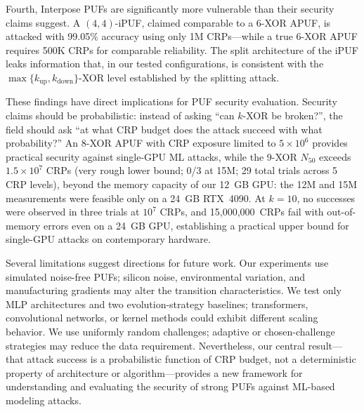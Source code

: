 Fourth, Interpose PUFs are significantly more vulnerable than their security
claims suggest.  A $(4,4)$-iPUF, claimed comparable to a 6-XOR APUF, is
attacked with 99.05\% accuracy using only 1M CRPs---while a true 6-XOR APUF
requires 500K CRPs for comparable reliability.  The split architecture of the
iPUF leaks information that, in our tested configurations, is consistent
with the $\max\{k_{\text{up}}, k_{\text{down}}\}$-XOR level established by
the splitting attack.

These findings have direct implications for PUF security evaluation.  Security
claims should be probabilistic: instead of asking ``can $k$-XOR be broken?'',
the field should ask ``at what CRP budget does the attack succeed with what
probability?''  An 8-XOR APUF with CRP exposure limited to $5\times10^6$
provides practical security against single-GPU ML attacks, while the 9-XOR
$N_{50}$ exceeds $1.5\times10^7$ CRPs (very rough lower bound; 0/3 at 15M;
29 total trials across 5 CRP levels), beyond the memory
capacity of our 12~GB GPU: the 12M and 15M measurements were feasible only on
a 24~GB RTX~4090.  At $k = 10$, no successes were observed in three trials at
$10^7$ CRPs, and 15{,}000{,}000~CRPs fail with out-of-memory errors even on
a 24~GB GPU, establishing a practical upper bound for single-GPU attacks on
contemporary hardware.

Several limitations suggest directions for future work.  Our experiments use
simulated noise-free PUFs; silicon noise, environmental variation, and
manufacturing gradients may alter the transition characteristics.  We test
only MLP architectures and two evolution-strategy baselines; transformers,
convolutional networks, or kernel methods could exhibit different scaling
behavior.  We use uniformly random
challenges; adaptive or chosen-challenge strategies may reduce the data
requirement.  Nevertheless, our central result---that attack success is a
probabilistic function of CRP budget, not a deterministic property of
architecture or algorithm---provides a new framework for understanding and
evaluating the security of strong PUFs against ML-based modeling attacks.
